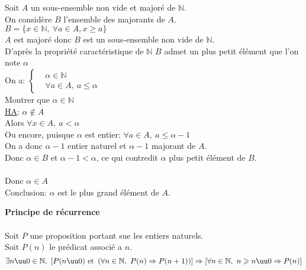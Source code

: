 \documentclass[12pt,twoside,a4paper]{article}
\begin{document}
		\begin{preuve}
			Soit $A$ un sous-ensemble non vide et major\'e de $\mathbb{N}$.\\
			On consid\`ere $B$ l'ensemble des majorants de $A$.\\
			$B=\{x\in\mathbb{N},\ \forall a\in A, x\geqslant a\}$\\
			$A$ est major\'e donc $B$ est un sous-ensemble non vide de $\mathbb{N}$.\\
			D'apr\`es la propri\'et\'e caract\'eristique de $\mathbb{N}$ $B$ admet un plus petit \'el\'ement que l'on note $\alpha$\\
			On a: $\left\lbrace\begin{aligned}&\alpha\in\mathbb{N}\\&\forall a\in A,\ a\leqslant\alpha\end{aligned}\right.$\\
			Montrer que $\alpha\in\mathbb{N}$\\
			\underline{HA}: $\alpha \notin A$\\
			Alors $\forall x\in A,\ a<\alpha$\\
			Ou encore, puisque $\alpha$ est entier: $\forall a\in A,\ a\leqslant\alpha-1$\\
			On a donc $\alpha-1$ entier naturel et $\alpha-1$ majorant de $A$.\\
			Donc $\alpha\in B$ et $\alpha-1<\alpha$, ce qui contredit $\alpha$ plus petit \'el\'ement de $B$.\\
			\\
			Donc $\alpha\in A$\\
			Conclusion: $\alpha$ est le plus grand \'el\'ement de $A$.
		\end{preuve}
		\begin{coro}
			\textbf{Principe de r\'ecurrence}\\
			\\
			Soit $P$ une proposition portant sue les entiers naturels.\\
			Soit $P(n)$ le pr\'edicat associ\'e a $n$.\\
			$$\exists n\uu0\in\mathbb{N},\ \left[P(n\uu0)\text{ et }\left(\forall n\in\mathbb{N},\ P(n)\Rightarrow P(n+1)\right)\right]\Rightarrow\left[\forall n\in\mathbb{N},\ n\geqslant n\uu0\Rightarrow P(n)\right]$$
		\end{coro}
\end{document}
